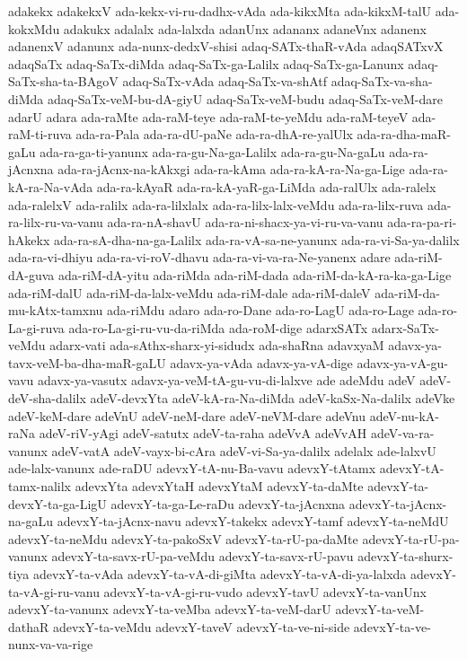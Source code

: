 {adakekx
adakekxV
ada-kekx-vi-ru-dadhx-vAda
ada-kikxMta
ada-kikxM-talU
ada-kokxMdu
adakukx
adalalx
ada-lalxda
adanUnx
adananx
adaneVnx
adanenx
adanenxV
adanunx
ada-nunx-dedxV-shisi
adaq-SATx-thaR-vAda
adaqSATxvX
adaqSaTx
adaq-SaTx-diMda
adaq-SaTx-ga-Lalilx
adaq-SaTx-ga-Lanunx
adaq-SaTx-sha-ta-BAgoV
adaq-SaTx-vAda
adaq-SaTx-va-shAtf
adaq-SaTx-va-sha-diMda
adaq-SaTx-veM-bu-dA-giyU
adaq-SaTx-veM-budu
adaq-SaTx-veM-dare
adarU
adara
ada-raMte
ada-raM-teye
ada-raM-te-yeMdu
ada-raM-teyeV
ada-raM-ti-ruva
ada-ra-Pala
ada-ra-dU-paNe
ada-ra-dhA-re-yalUlx
ada-ra-dha-maR-gaLu
ada-ra-ga-ti-yanunx
ada-ra-gu-Na-ga-Lalilx
ada-ra-gu-Na-gaLu
ada-ra-jAcnxna
ada-ra-jAcnx-na-kAkxgi
ada-ra-kAma
ada-ra-kA-ra-Na-ga-Lige
ada-ra-kA-ra-Na-vAda
ada-ra-kAyaR
ada-ra-kA-yaR-ga-LiMda
ada-ralUlx
ada-ralelx
ada-ralelxV
ada-ralilx
ada-ra-lilxlalx
ada-ra-lilx-lalx-veMdu
ada-ra-lilx-ruva
ada-ra-lilx-ru-va-vanu
ada-ra-nA-shavU
ada-ra-ni-shacx-ya-vi-ru-va-vanu
ada-ra-pa-ri-hAkekx
ada-ra-sA-dha-na-ga-Lalilx
ada-ra-vA-sa-ne-yanunx
ada-ra-vi-Sa-ya-dalilx
ada-ra-vi-dhiyu
ada-ra-vi-roV-dhavu
ada-ra-vi-va-ra-Ne-yanenx
adare
ada-riM-dA-guva
ada-riM-dA-yitu
ada-riMda
ada-riM-dada
ada-riM-da-kA-ra-ka-ga-Lige
ada-riM-dalU
ada-riM-da-lalx-veMdu
ada-riM-dale
ada-riM-daleV
ada-riM-da-mu-kAtx-tamxnu
ada-riMdu
adaro
ada-ro-Dane
ada-ro-LagU
ada-ro-Lage
ada-ro-La-gi-ruva
ada-ro-La-gi-ru-vu-da-riMda
ada-roM-dige
adarxSATx
adarx-SaTx-veMdu
adarx-vati
ada-sAthx-sharx-yi-sidudx
ada-shaRna
adavxyaM
adavx-ya-tavx-veM-ba-dha-maR-gaLU
adavx-ya-vAda
adavx-ya-vA-dige
adavx-ya-vA-gu-vavu
adavx-ya-vasutx
adavx-ya-veM-tA-gu-vu-di-lalxve
ade
adeMdu
adeV
adeV-deV-sha-dalilx
adeV-devxYta
adeV-kA-ra-Na-diMda
adeV-kaSx-Na-dalilx
adeVke
adeV-keM-dare
adeVnU
adeV-neM-dare
adeV-neVM-dare
adeVnu
adeV-nu-kA-raNa
adeV-riV-yAgi
adeV-satutx
adeV-ta-raha
adeVvA
adeVvAH
adeV-va-ra-vanunx
adeV-vatA
adeV-vayx-bi-cAra
adeV-vi-Sa-ya-dalilx
adelalx
ade-lalxvU
ade-lalx-vanunx
ade-raDU
adevxY-tA-nu-Ba-vavu
adevxY-tAtamx
adevxY-tA-tamx-nalilx
adevxYta
adevxYtaH
adevxYtaM
adevxY-ta-daMte
adevxY-ta-devxY-ta-ga-LigU
adevxY-ta-ga-Le-raDu
adevxY-ta-jAcnxna
adevxY-ta-jAcnx-na-gaLu
adevxY-ta-jAcnx-navu
adevxY-takekx
adevxY-tamf
adevxY-ta-neMdU
adevxY-ta-neMdu
adevxY-ta-pakoSxV
adevxY-ta-rU-pa-daMte
adevxY-ta-rU-pa-vanunx
adevxY-ta-savx-rU-pa-veMdu
adevxY-ta-savx-rU-pavu
adevxY-ta-shurx-tiya
adevxY-ta-vAda
adevxY-ta-vA-di-giMta
adevxY-ta-vA-di-ya-lalxda
adevxY-ta-vA-gi-ru-vanu
adevxY-ta-vA-gi-ru-vudo
adevxY-tavU
adevxY-ta-vanUnx
adevxY-ta-vanunx
adevxY-ta-veMba
adevxY-ta-veM-darU
adevxY-ta-veM-dathaR
adevxY-ta-veMdu
adevxY-taveV
adevxY-ta-ve-ni-side
adevxY-ta-ve-nunx-va-va-rige
}
